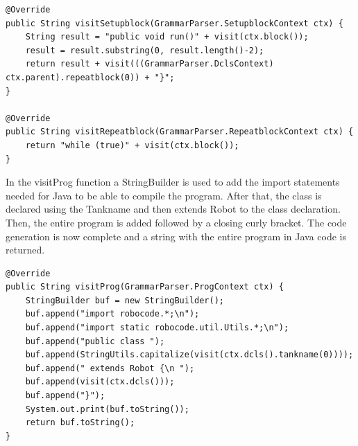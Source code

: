 \begin{lstlisting}[caption={CodeGen - visitSetupblock \& visitRepeatblock functions}, label={VSRB}]
@Override
public String visitSetupblock(GrammarParser.SetupblockContext ctx) {
    String result = "public void run()" + visit(ctx.block());
    result = result.substring(0, result.length()-2);
    return result + visit(((GrammarParser.DclsContext) ctx.parent).repeatblock(0)) + "}";
}

@Override
public String visitRepeatblock(GrammarParser.RepeatblockContext ctx) {
    return "while (true)" + visit(ctx.block());
}
\end{lstlisting}

In the visitProg function a StringBuilder is used to add the import statements needed for Java to be able to compile the program. After that, the class is declared using the Tankname and then extends Robot to the class declaration. Then, the entire program is added followed by a closing curly bracket. The code generation is now complete and a string with the entire program in Java code is returned. 

\begin{lstlisting}[caption={CodeGen - visitProg function}, label={VP}]
@Override
public String visitProg(GrammarParser.ProgContext ctx) {
    StringBuilder buf = new StringBuilder();
    buf.append("import robocode.*;\n");
    buf.append("import static robocode.util.Utils.*;\n");
    buf.append("public class ");
    buf.append(StringUtils.capitalize(visit(ctx.dcls().tankname(0))));
    buf.append(" extends Robot {\n ");
    buf.append(visit(ctx.dcls()));
    buf.append("}");
    System.out.print(buf.toString());
    return buf.toString();
}
\end{lstlisting}

%


